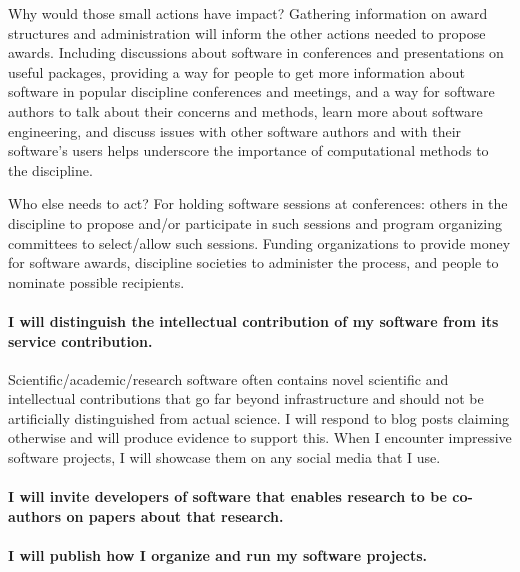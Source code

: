Why would those small actions have impact?
Gathering information on award structures and administration will inform the other actions needed to propose awards.
Including discussions about software in conferences and presentations on useful packages, providing a way for people to get more information about software in popular discipline conferences and meetings, and a way for software authors to talk about their concerns and methods, learn more about software engineering, and discuss issues with other software authors and with their software's users helps underscore the importance of computational methods to the discipline.

Who else needs to act? 
For holding software sessions at conferences: others in the discipline to propose and/or participate in such sessions and program organizing committees to select/allow such sessions. 
Funding organizations to provide money for software awards, discipline societies to administer the process, and people to nominate possible recipients. 


\paragraph{I will distinguish the intellectual contribution of my software from its service contribution.}

Scientific/academic/research software often contains novel scientific and intellectual contributions that go far beyond infrastructure and should not be artificially distinguished from actual science. I will respond to blog posts claiming otherwise and will produce evidence to support this. When I encounter impressive software projects, I will showcase them on any social media that I use.

\paragraph{I will invite developers of software that enables research to be co-authors on papers about that research.}

\paragraph{I will publish how I organize and run my software projects.}


